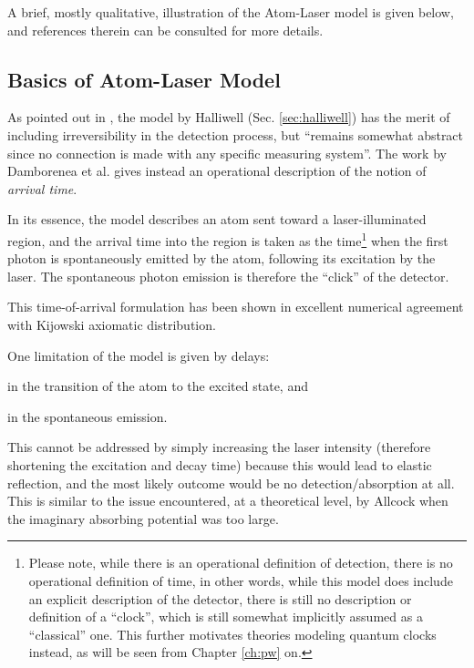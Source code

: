 A brief, mostly qualitative, illustration of the Atom-Laser model is
given below, and references therein can be consulted for more details.

\subsection{Basics of Atom-Laser Model}\label{sec:detect:atomlaser}

As pointed out in \cite{Damborenea}, the model by Halliwell (Sec. \ref{sec:halliwell})
has the merit of including irreversibility in the detection process,
but ``remains somewhat abstract
since no connection is made with any specific measuring
system''. The work by Damborenea et al. gives instead an operational
description of the notion of \emph{arrival time}.

In its essence, the model describes an atom sent toward a laser-illuminated region,
and the arrival time into the region is taken as the time\footnote{
  Please note, while there is an operational definition of detection,
  there is no operational definition of time, in other words,
  while this model does include an explicit description of the detector,
  there is still no description or definition of a ``clock'',
  which is still somewhat implicitly assumed as a ``classical'' one.
  This further motivates theories modeling quantum clocks instead,
  as will be seen from Chapter \ref{ch:pw} on.
}
when the first photon is spontaneously emitted by the atom,
following its excitation by the laser.
The spontaneous photon emission is therefore the ``click'' of the detector.

This time-of-arrival formulation has been shown in excellent numerical agreement
with Kijowski axiomatic distribution.

One limitation of the model is given by delays:
\begin{enumerate*}[label=\arabic*)]
  \item in the transition of the atom to the excited state, and
  \item in the spontaneous emission.
\end{enumerate*}
This cannot be addressed by simply increasing the laser intensity
(therefore shortening the excitation and decay time)
because this would lead to elastic reflection,
and the most likely outcome would be no detection/absorption at all.
This is similar to the issue encountered, at a theoretical level,
by Allcock when the imaginary absorbing potential was too large.

